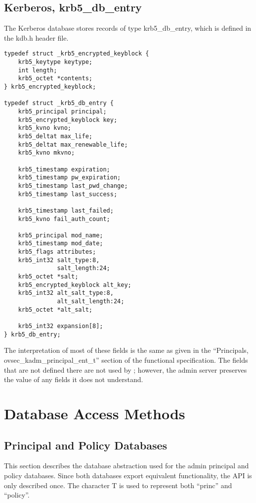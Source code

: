 \subsection{Kerberos, krb5_db_entry}

The Kerberos database stores records of type krb5_db_entry, which is
defined in the kdb.h header file.

\begin{verbatim}
typedef struct _krb5_encrypted_keyblock {
    krb5_keytype keytype;
    int length;
    krb5_octet *contents;
} krb5_encrypted_keyblock;

typedef struct _krb5_db_entry {
    krb5_principal principal;
    krb5_encrypted_keyblock key;
    krb5_kvno kvno;
    krb5_deltat max_life;
    krb5_deltat max_renewable_life;
    krb5_kvno mkvno;
    
    krb5_timestamp expiration;
    krb5_timestamp pw_expiration;
    krb5_timestamp last_pwd_change;
    krb5_timestamp last_success;   
    
    krb5_timestamp last_failed;
    krb5_kvno fail_auth_count;
    
    krb5_principal mod_name;
    krb5_timestamp mod_date;
    krb5_flags attributes;
    krb5_int32 salt_type:8,
               salt_length:24;
    krb5_octet *salt;
    krb5_encrypted_keyblock alt_key;
    krb5_int32 alt_salt_type:8,
               alt_salt_length:24;
    krb5_octet *alt_salt;
    
    krb5_int32 expansion[8];
} krb5_db_entry;
\end{verbatim}

The interpretation of most of these fields is the same as given in the
``Principals, ovsec_kadm_principal_ent_t'' section of the functional
specification.  The fields that are not defined there are not used by
\secure{}; however, the admin server preserves the value of any fields
it does not understand.

\section{Database Access Methods}

\subsection{Principal and Policy Databases}

This section describes the database abstraction used for the admin
principal and policy databases.  Since both databases export
equivalent functionality, the API is only described once.  The
character T is used to represent both ``princ'' and ``policy''.


